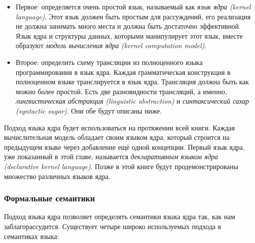 \begin{itemize}
\item{Первое: определяется очень простой язык, называемый как \emph{язык ядра (kernel language)}. Этот язык должен быть простым для рассуждений, его реализация не должна занимать много места и должна быть достаточно эффективной. Язык ядра и структуры данных, которыми манипулирует этот язык, вместе образуют \emph{модель вычисления ядра (kernel computation model)}.}

\item{Второе: определить схему трансляции из полноценного языка программирования в язык ядра. Каждая грамматическая конструкция в полноценном языке транслируется в язык ядра. Трансляция должна быть как можно более простой. Есть две разновидности трансляций, а именно, \emph{лингвистическая абстракция (linguistic abstraction)} и \emph{синтаксический сахар (syntactic sugar)}. Они обе будут описаны ниже.}
\end{itemize}

Подход языка ядра будет использоваться на протяжении всей книги. Каждая вычислительная модель обладает своим языком ядра, который строится на предыдущем языке через добавление ещё одной концепции. Первый язык ядра, уже показанный в этой главе, называется \emph{декларативным языком ядра (declarative kernel language)}. Позже в этой книге будут продемонстрированы множество различных языков ядра.

\subsubsection{Формальные семантики}

Подход языка ядра позволяет определять семантики языка ядра так, как нам заблагорассудится. Существует четыре широко используемых подхода в семантиках языка:

